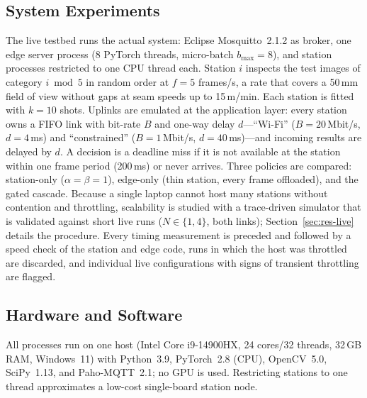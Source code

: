 \subsection{System Experiments}
The live testbed runs the actual system: Eclipse Mosquitto~2.1.2 as broker, one edge server process (8 PyTorch threads, micro-batch $b_{\max}=8$), and station processes restricted to one CPU thread each. Station $i$ inspects the test images of category $i \bmod 5$ in random order at $f=5$ frames/s, a rate that covers a 50\,mm field of view without gaps at seam speeds up to 15\,m/min. Each station is fitted with $k=10$ shots. Uplinks are emulated at the application layer: every station owns a FIFO link with bit-rate $B$ and one-way delay $d$---``Wi-Fi'' ($B=20$\,Mbit/s, $d=4$\,ms) and ``constrained'' ($B=1$\,Mbit/s, $d=40$\,ms)---and incoming results are delayed by $d$. A decision is a deadline miss if it is not available at the station within one frame period (200\,ms) or never arrives. Three policies are compared: station-only ($\alpha=\beta=1$), edge-only (thin station, every frame offloaded), and the gated cascade. Because a single laptop cannot host many stations without contention and throttling, scalability is studied with a trace-driven simulator that is validated against short live runs ($N\in\{1,4\}$, both links); Section~\ref{sec:res-live} details the procedure. Every timing measurement is preceded and followed by a speed check of the station and edge code, runs in which the host was throttled are discarded, and individual live configurations with signs of transient throttling are flagged.

\subsection{Hardware and Software}
All processes run on one host (Intel Core i9-14900HX, 24 cores/32 threads, 32\,GB RAM, Windows~11) with Python~3.9, PyTorch~2.8 (CPU), OpenCV~5.0, SciPy~1.13, and Paho-MQTT~2.1; no GPU is used. Restricting stations to one thread approximates a low-cost single-board station node.
